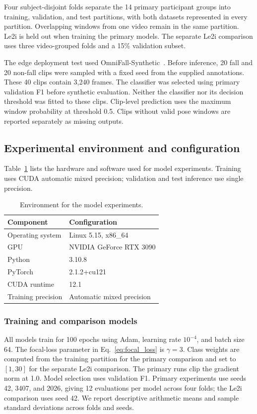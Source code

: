 Four subject-disjoint folds separate the 14 primary participant groups into training, validation, and test partitions, with both datasets represented in every partition. Overlapping windows from one video remain in the same partition. Le2i is held out when training the primary models. The separate Le2i comparison uses three video-grouped folds and a 15\% validation subset.

The edge deployment test used OmniFall-Synthetic~\cite{omnifallDataset2026}. Before inference, 20 fall and 20 non-fall clips were sampled with a fixed seed from the supplied annotations. These 40 clips contain 3,240 frames. The classifier was selected using primary validation F1 before synthetic evaluation. Neither the classifier nor its decision threshold was fitted to these clips. Clip-level prediction uses the maximum window probability at threshold 0.5. Clips without valid pose windows are reported separately as missing outputs.

\subsection{Experimental environment and configuration}

Table~\ref{tab:environment} lists the hardware and software used for model experiments. Training uses CUDA automatic mixed precision; validation and test inference use single precision.

\begin{table}[!ht]
    \centering
    \small
    \caption{Environment for the model experiments.}
    \label{tab:environment}
    \begin{tabularx}{\columnwidth}{lX}
        \toprule
        Component & Configuration \\
        \midrule
        Operating system & Linux 5.15, x86\_64 \\
        GPU & NVIDIA GeForce RTX 3090 \\
        Python & 3.10.8 \\
        PyTorch & 2.1.2+cu121 \\
        CUDA runtime & 12.1 \\
        Training precision & Automatic mixed precision \\
        \bottomrule
    \end{tabularx}
\end{table}

\subsubsection{Training and comparison models}
All models train for 100 epochs using Adam, learning rate $10^{-4}$, and batch size 64. The focal-loss parameter in Eq.~\eqref{eq:focal_loss} is $\gamma=3$. Class weights are computed from the training partition for the primary comparison and set to $[1,30]$ for the separate Le2i comparison. The primary runs clip the gradient norm at 1.0. Model selection uses validation F1. Primary experiments use seeds 42, 3407, and 2026, giving 12 evaluations per model across four folds; the Le2i comparison uses seed 42. We report descriptive arithmetic means and sample standard deviations across folds and seeds.

